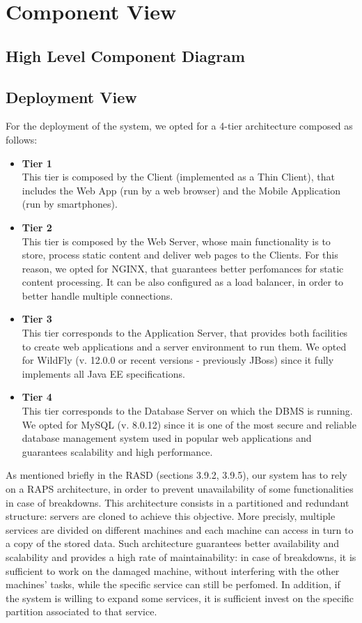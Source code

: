 \documentclass[12pt,a4paper]{article}
\begin{document}
\section{Component View}
	\subsection{High Level Component Diagram}	
	\subsection{Deployment View}
	For the deployment of the system, we opted for a 4-tier architecture composed as follows:
	\begin{itemize}
		\item \textbf{Tier 1}\\
		This tier is composed by the Client (implemented as a Thin Client), that includes the Web App (run by a web browser) and the Mobile Application (run by smartphones). 
		\item \textbf{Tier 2}\\
		This tier is composed by the Web Server, whose main functionality is to store, process static content and deliver web pages to the Clients. For this reason, we opted for NGINX, that guarantees better perfomances for static content processing. It can be also configured as a load balancer, in order to better handle multiple connections.
		\item \textbf{Tier 3}\\
		This tier corresponds to the Application Server, that provides both facilities to create web applications and a server environment to run them. We opted for WildFly (v. 12.0.0 or recent versions - previously JBoss) since it fully implements all Java EE specifications.
		\item \textbf{Tier 4}\\
		This tier corresponds to the Database Server on which the DBMS is running. We opted for MySQL (v. 8.0.12) since it is one of the most secure and reliable database management system used in popular web applications and guarantees scalability and high performance.
	\end{itemize}

	As mentioned briefly in the RASD (sections 3.9.2, 3.9.5), our system has to rely on a RAPS architecture, in order to prevent unavailability of some functionalities in case of breakdowns. This architecture consists in a partitioned and redundant structure: servers are cloned to achieve this objective.
	More precisly, multiple services are divided on different machines and each machine can access in turn to a copy of the stored data. Such architecture guarantees better availability and scalability and provides a high rate of maintainability: in case of breakdowns, it is sufficient to work on the damaged machine, without interfering with the other machines' tasks, while the specific service can still be perfomed. 
	In addition, if the system is willing to expand some services, it is sufficient invest on the specific partition associated to that service.
	
\end{document}
